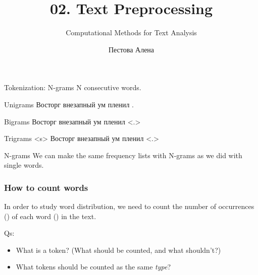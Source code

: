\documentclass{beamer}
\title{02. Text Preprocessing}
\subtitle{Computational Methods for Text Analysis}
\author{Пестова Алена}
\institute{НИУ ВШЭ Санкт-Петербург}
\begin{document}
    \begin{frame}
        \titlepage
    \end{frame}

    \begin{frame}{Tokenization: N-grams}
        N consecutive words.
        \begin{block}{Unigrams}
            \alert<2>{Восторг} \alert<3>{внезапный} \alert<4>{ум}
            \alert<5>{пленил} .
        \end{block}

  \begin{block}{Bigrams}
  \alert<2>{Восторг} \alert<2-3>{внезапный} \alert<3-4>{ум}
  \alert<4-5>{пленил} \alert<5>{<.>}
  \end{block}

  \begin{block}{Trigrams}
  \alert<2>{<s>}  \alert<2-3>{Восторг} \alert<2-4>{внезапный}
  \alert<3-5>{ум} \alert<4-5>{пленил} \alert<5>{<.>}
  \end{block}
\end{frame}


    \begin{frame}{N-grams}
        We can make the same frequency lists with N-grams as we did with single words.

    \end{frame}


    \begin{frame}
          \frametitle{How to count words}
  \Large
  In order to study word distribution, we need to count the number of
  occurrences () of each word
  () in the text.

  \begin{block}{Qs:}
  \begin{itemize}
  \item What is a token? (What should be counted, and what shouldn't?)
  \item What tokens should be counted as the same \textit{type}?
  \end{itemize}
  \end{block}
\end{frame}
\end{document}
